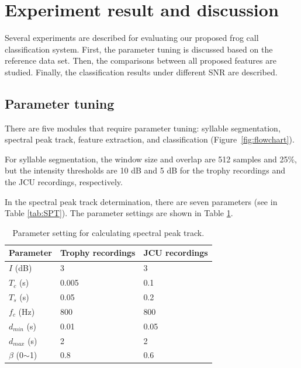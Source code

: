 %


\section{Experiment result and discussion}
Several experiments are described for evaluating our proposed frog call classification system. First, the parameter tuning is discussed based on the reference data set. Then, the comparisons between all proposed features are studied. Finally, the classification results under different SNR are described.

\subsection{Parameter tuning}
There are five modules that require parameter tuning: syllable segmentation, spectral peak track, feature extraction, and classification (Figure~\ref{fig:flowchart}). 

For syllable segmentation, the window size and overlap are 512 samples and 25\%, but the intensity thresholds are 10 dB and 5 dB for the trophy recordings and the JCU recordings, respectively.


In the spectral peak track determination, there are seven parameters (see in Table \ref{tab:SPT}). The parameter settings are shown in Table \ref{tab:value}.
\begin{table}[htb!]
\centering
\caption{Parameter setting for calculating spectral peak track.}
\label{tab:value}
\begin{tabular}{lll}
\hline
\textbf{Parameter} & \textbf{Trophy recordings} & \textbf{JCU recordings} \\ \hline\hline
   $I$ (dB)        & 3             & 3             \\ 
    $T_{c}$ (s)        & 0.005         & 0.1           \\ 
  $T_{s}$ (s)        & 0.05          & 0.2           \\ 
      $f_{c}$ (Hz)        & 800           & 800           \\ 
   $d_{min}$ (s)         & 0.01          & 0.05          \\ 
     $d_{max}$ (s)        & 2             & 2             \\ 
     $\beta$ (0$\sim$1)          & 0.8           & 0.6           \\ \hline\hline
\end{tabular}
\end{table}
                              


